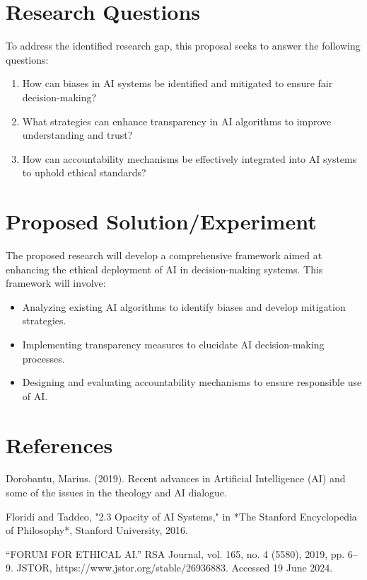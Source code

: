 \documentclass[journal]{IEEEtai}
\begin{document}
\section{Research Questions}

To address the identified research gap, this proposal seeks to answer the following questions:
\begin{enumerate}
    \item How can biases in AI systems be identified and mitigated to ensure fair decision-making?
    \item What strategies can enhance transparency in AI algorithms to improve understanding and trust?
    \item How can accountability mechanisms be effectively integrated into AI systems to uphold ethical standards?
\end{enumerate}

\section{Proposed Solution/Experiment}

The proposed research will develop a comprehensive framework aimed at enhancing the ethical deployment of AI in decision-making systems. This framework will involve:
\begin{itemize}
    \item Analyzing existing AI algorithms to identify biases and develop mitigation strategies.
    \item Implementing transparency measures to elucidate AI decision-making processes.
    \item Designing and evaluating accountability mechanisms to ensure responsible use of AI.
\end{itemize}

\section*{References}

Dorobantu, Marius. (2019). Recent advances in Artificial Intelligence (AI) and some of the issues in the theology and AI dialogue.

Floridi and Taddeo, "2.3 Opacity of AI Systems," in *The Stanford Encyclopedia of Philosophy*, Stanford University, 2016.

“FORUM FOR ETHICAL AI.” RSA Journal, vol. 165, no. 4 (5580), 2019, pp. 6–9. JSTOR, https://www.jstor.org/stable/26936883. Accessed 19 June 2024.
\end{document}
